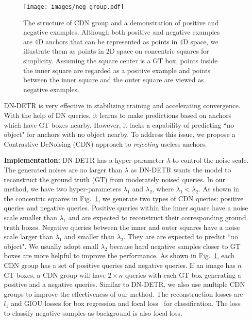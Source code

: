 \documentclass[runningheads]{llncs}
\begin{document}
\begin{figure}[h]
\texttt{[image: images/neg\_group.pdf]}
    \centering
    \vspace{-0.3cm}
    \caption{The structure of CDN group and a demonstration of positive and negative examples.
Although both positive and negative examples are $4$D anchors that can be represented as points in $4$D space, we illustrate them as points in $2$D space on concentric squares for simplicity. Assuming the square center is a GT box, points inside the inner square are regarded as a positive example and points between the inner square and the outer square are viewed as negative examples.
    }
    \label{fig:CDN}
\end{figure} DN-DETR is very effective in stabilizing training and accelerating convergence. With the help of DN queries, it learns to make predictions based on anchors which have GT boxes nearby. However, it lacks a capability of predicting ``no object" for anchors with no object nearby. To address this issue, we propose a Contrastive DeNoising (CDN) approach to \emph{rejecting} useless anchors. 

\noindent\textbf{Implementation:} DN-DETR has a hyper-parameter $\lambda$ to control the noise scale. The generated noises are no larger than $\lambda$ as DN-DETR wants the model to reconstruct the ground truth (GT) from moderately noised queries. In our method, we have two hyper-parameters $\lambda_1$ and $\lambda_2$, where $\lambda_1 < \lambda_2$. As shown in the concentric squares in Fig.~\ref{fig:CDN}, we generate two types of CDN queries: positive queries and negative queries. Positive queries within the inner square have a noise scale smaller than $\lambda_1$ and are expected to reconstruct their corresponding ground truth boxes. Negative queries between the inner and outer squares have a noise scale larger than $\lambda_1$ and smaller than $\lambda_2$. They are are expected to predict ``no object". We usually adopt small $\lambda_2$ because hard negative samples closer to GT boxes are more helpful to improve the performance. As shown in Fig.~\ref{fig:CDN}, each CDN group has a set of positive queries and negative queries. If an image has $n$ GT boxes, a CDN group will have $2\times n$ queries with each GT box generating a positive and a negative queries. Similar to DN-DETR, we also use multiple CDN groups to improve the effectiveness of our method. The reconstruction losses are $l_1$ and GIOU losses for 
box regression and focal loss~\cite{lin2018focal} for classification. The loss to classify negative samples as background is also focal loss.
\end{document}

